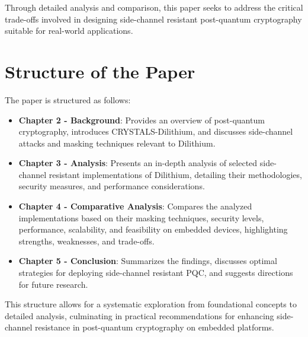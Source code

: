 Through detailed analysis and comparison, this paper seeks to address the critical trade-offs involved in designing side-channel resistant post-quantum cryptography suitable for real-world applications.

\section{Structure of the Paper}

The paper is structured as follows:

\begin{itemize}
    \item \textbf{Chapter 2 - Background}: Provides an overview of post-quantum cryptography, introduces CRYSTALS-Dilithium, and discusses side-channel attacks and masking techniques relevant to Dilithium.
    \item \textbf{Chapter 3 - Analysis}: Presents an in-depth analysis of selected side-channel resistant implementations of Dilithium, detailing their methodologies, security measures, and performance considerations.
    \item \textbf{Chapter 4 - Comparative Analysis}: Compares the analyzed implementations based on their masking techniques, security levels, performance, scalability, and feasibility on embedded devices, highlighting strengths, weaknesses, and trade-offs.
    \item \textbf{Chapter 5 - Conclusion}: Summarizes the findings, discusses optimal strategies for deploying side-channel resistant PQC, and suggests directions for future research.
\end{itemize}

This structure allows for a systematic exploration from foundational concepts to detailed analysis, culminating in practical recommendations for enhancing side-channel resistance in post-quantum cryptography on embedded platforms.
